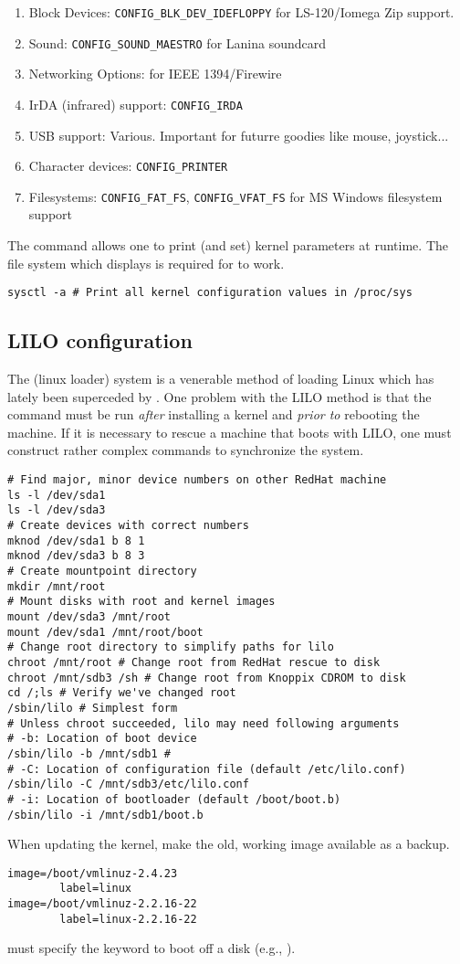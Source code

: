 \documentclass[12pt,twoside]{article}
\begin{document}
\begin{enumerate}
\item Block Devices: \verb'CONFIG_BLK_DEV_IDEFLOPPY' for LS-120/Iomega Zip support.
\item Sound: \verb'CONFIG_SOUND_MAESTRO' for Lanina soundcard
\item Networking Options: \verb'' for IEEE 1394/Firewire
\item IrDA (infrared) support: \verb'CONFIG_IRDA' 
\item USB support: Various. Important for futurre goodies like mouse, joystick...
\item Character devices: \verb'CONFIG_PRINTER'
\item Filesystems: \verb'CONFIG_FAT_FS', \verb'CONFIG_VFAT_FS' for MS
Windows filesystem support
\end{enumerate}

The  command allows one to print (and set) kernel
parameters at runtime.
The  file system which displays  is
required for  to work.
\begin{verbatim}
sysctl -a # Print all kernel configuration values in /proc/sys
\end{verbatim}

\subsection{LILO configuration}\label{sxn:lilo}
The  (linux loader) system is a venerable method of
loading Linux which has lately been superceded by .
One problem with the LILO method is that the  command
must be run \textit{after} installing a kernel and \textit{prior to}
rebooting the machine. 
If it is necessary to rescue a machine that boots with LILO, one must
construct rather complex  commands to synchronize the
system. 
\begin{verbatim}
# Find major, minor device numbers on other RedHat machine
ls -l /dev/sda1
ls -l /dev/sda3
# Create devices with correct numbers
mknod /dev/sda1 b 8 1
mknod /dev/sda3 b 8 3
# Create mountpoint directory
mkdir /mnt/root
# Mount disks with root and kernel images
mount /dev/sda3 /mnt/root
mount /dev/sda1 /mnt/root/boot
# Change root directory to simplify paths for lilo
chroot /mnt/root # Change root from RedHat rescue to disk
chroot /mnt/sdb3 /sh # Change root from Knoppix CDROM to disk
cd /;ls # Verify we've changed root
/sbin/lilo # Simplest form
# Unless chroot succeeded, lilo may need following arguments
# -b: Location of boot device
/sbin/lilo -b /mnt/sdb1 # 
# -C: Location of configuration file (default /etc/lilo.conf)
/sbin/lilo -C /mnt/sdb3/etc/lilo.conf
# -i: Location of bootloader (default /boot/boot.b)
/sbin/lilo -i /mnt/sdb1/boot.b 
\end{verbatim}
When updating the kernel, make the old, working image available as a
backup.
\begin{verbatim}
image=/boot/vmlinuz-2.4.23
        label=linux
image=/boot/vmlinuz-2.2.16-22
        label=linux-2.2.16-22
\end{verbatim}
 must specify the  keyword
to boot off a  disk (e.g., ).
\end{document}
